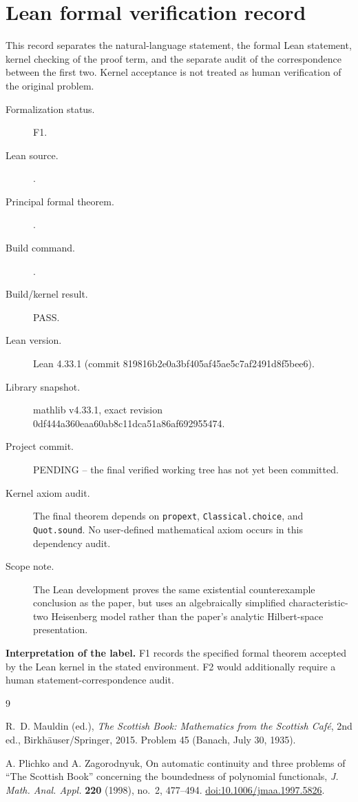 \documentclass[11pt]{article}
\theoremstyle{remark}
\begin{document}
\section*{Lean formal verification record}

\begingroup\small\sloppy
This record separates the natural-language statement, the formal Lean statement, kernel checking of the proof term, and the separate audit of the correspondence between the first two. Kernel acceptance is not treated as human verification of the original problem.

\begin{description}
\item[Formalization status.] F1.
\item[Lean source.] \texttt{}.
\item[Principal formal theorem.] \texttt{}.
\item[Build command.] \texttt{}.
\item[Build/kernel result.] PASS.
\item[Lean version.] Lean 4.33.1 (commit 819816b2e0a3bf405af45ae5c7af2491d8f5bee6).
\item[Library snapshot.] mathlib v4.33.1, exact revision 0df444a360eaa60ab8c11dca51a86af692955474.
\item[Project commit.] PENDING -- the final verified working tree has not yet been committed.
\item[Kernel axiom audit.] The final theorem depends on \texttt{propext}, \texttt{Classical.choice}, and \texttt{Quot.sound}. No user-defined mathematical axiom occurs in this dependency audit.
\item[Scope note.] The Lean development proves the same existential counterexample conclusion as the paper, but uses an algebraically simplified characteristic-two Heisenberg model rather than the paper's analytic Hilbert-space presentation.
\end{description}

\noindent\textbf{Interpretation of the label.} F1 records the specified formal theorem accepted by the Lean kernel in the stated environment. F2 would additionally require a human statement-correspondence audit.
\endgroup

\begin{thebibliography}{9}

R.~D. Mauldin (ed.),
\emph{The Scottish Book: Mathematics from the Scottish Caf\'e},
2nd ed., Birkh\"auser/Springer, 2015.
Problem 45 (Banach, July 30, 1935).

A. Plichko and A. Zagorodnyuk,
On automatic continuity and three problems of ``The Scottish Book'' concerning the boundedness of polynomial functionals,
\emph{J. Math. Anal. Appl.} \textbf{220} (1998), no.~2, 477--494.
\href{https://doi.org/10.1006/jmaa.1997.5826}{doi:10.1006/jmaa.1997.5826}.

\end{thebibliography}
\end{document}
